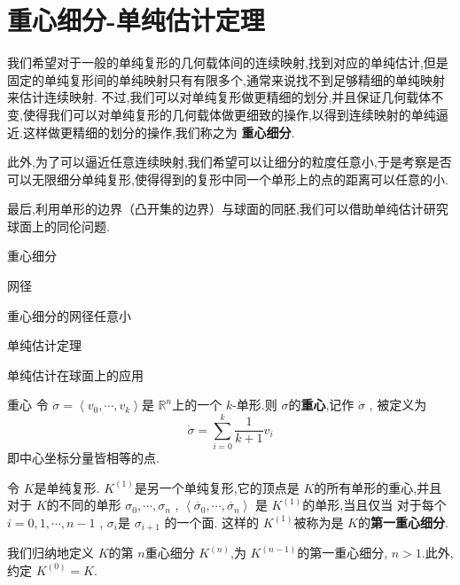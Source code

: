 \documentclass[../../几何与拓扑.tex]{subfiles}
\begin{document}
\section{重心细分-单纯估计定理}

我们希望对于一般的单纯复形的几何载体间的连续映射,找到对应的单纯估计,但是固定的单纯复形间的单纯映射只有有限多个,通常来说找不到足够精细的单纯映射来估计连续映射.
不过,我们可以对单纯复形做更精细的划分,并且保证几何载体不变,使得我们可以对单纯复形的几何载体做更细致的操作,以得到连续映射的单纯逼近.这样做更精细的划分的操作,我们称之为 \textbf{重心细分}.

此外,为了可以逼近任意连续映射,我们希望可以让细分的粒度任意小,于是考察是否可以无限细分单纯复形,使得得到的复形中同一个单形上的点的距离可以任意的小.

最后,利用单形的边界（凸开集的边界）与球面的同胚,我们可以借助单纯估计研究球面上的同伦问题.

\begin{introduction}
    \item 重心细分 
    \item 网径
    \item 重心细分的网径任意小
    \item 单纯估计定理
    \item 单纯估计在球面上的应用
\end{introduction}

\begin{definition}{重心}
    令 \(   \sigma  =  \left< v_0,\cdots,v_{k}  \right>  \)是  \(  \mathbb{R} ^{n}  \)上的一个 \(  k  \)-单形.则
    \(   \sigma   \)的\textbf{重心},记作 \(  \dot{\sigma}   \) , 被定义为 \[
     \dot{\sigma}=  \sum _{i= 0}^{k} \frac{1 }{k+ 1 }v_{i} 
    \] 即中心坐标分量皆相等的点.
\end{definition}
\begin{definition}
    令 \(  K  \)是单纯复形. \(  K^{\left( 1 \right) }  \)是另一个单纯复形,它的顶点是 \(  K  \)的所有单形的重心,并且对于 \(  K  \)的不同的单形
     \(    \sigma_0,\cdots,\sigma_{n}   \)  , \(  \left<  \dot{\sigma_0},\cdots,\dot{\sigma_{n}}  \right>  \)  是 \(  K^{\left( 1 \right) }  \)的单形,当且仅当 对于每个 \(  i=  0, 1,\cdots,n -1  \)  , \(   \sigma _i   \)是 \(   \sigma _{i+ 1}  \)  的一个面.
     这样的 \(  K^{\left( 1 \right) }  \)被称为是 \(  K  \)的\textbf{第一重心细分}.
     
     我们归纳地定义  \(  K  \)的第 \(  n  \)重心细分 \(  K^{\left( n \right) }  \),为 \(  K^{\left( n-1 \right) }  \)的第一重心细分, \(  n>1  \).此外,约定 \(  K^{\left( 0 \right) } =  K  \).      
\end{definition}
\end{document}
